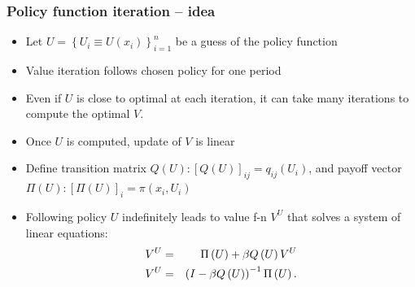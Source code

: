 \documentclass[bigger,handout]{beamer}
\newenvironment{stepitemize}{\begin{itemize}[<+->]}{\end{itemize} }
\begin{document}
\begin{frame}%

\frametitle{Policy function iteration -- idea}

\begin{stepitemize}
\item Let $U=\left\{ U_{i}\equiv U(x_{i})\right\} _{i=1}^{n}$ be a guess of
the policy function

\item Value iteration follows chosen policy for one period

\item Even if $U$ is close to optimal at each iteration, \newline
it can take many iterations to compute the optimal $V$. \bigskip

\item Once $U$ is computed, update of $V$ is linear

\item Define transition matrix $Q\left( U\right) :\left[ Q\left( U\right) %
\right] _{ij}=q_{ij}(U_{i})$,\newline
and payoff vector $\Pi \left( U\right) :\left[ \Pi \left( U\right) \right]
_{i}=\pi (x_{i},U_{i})$

\item Following policy $U$ indefinitely leads to value f-n $V^{U}$ \newline
that solves a system of linear equations:
\begin{eqnarray}
V^{U} &=&\Pi \left( U\right) +\beta Q\left( U\right) V^{U}  \label{eq:SLE} \\
V^{U} &=&\left( I-\beta Q\left( U\right) \right) ^{-1}\Pi \left( U\right) .
\notag
\end{eqnarray}
\end{stepitemize}



\end{frame}%
\end{document}

